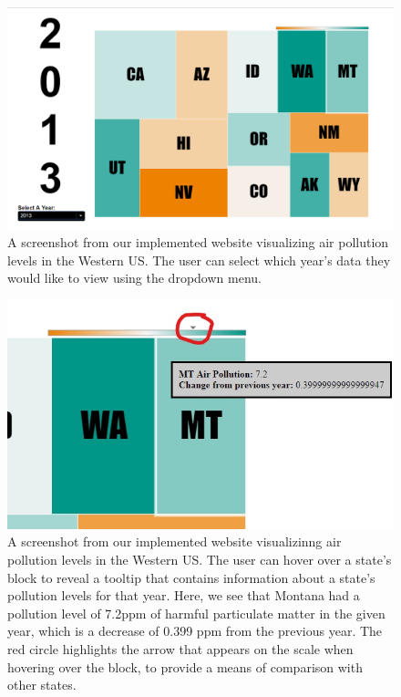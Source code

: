 \documentclass[journal]{vgtc}                %
\begin{document}
\begin{figure}
   \includegraphics[width=\columnwidth]{2013_viz.png}
   \caption{A screenshot from our implemented website visualizing air pollution levels in the Western US. The user can select which year's data they
   would like to view using the dropdown menu. \label{fig:screenshot_all}}
\end{figure}

\begin{figure}
   \includegraphics[width=\columnwidth]{screenshot_hover.jpg}
   \caption{A screenshot from our implemented website visualizinng air pollution levels in the Western US. The user can hover over a state's block
   to reveal a tooltip that contains information about a state's pollution levels for that year. Here, we see that Montana had a pollution level of
   7.2ppm of harmful particulate matter in the given year, which is a decrease of 0.399 ppm from the previous year. The red circle highlights the arrow
   that appears on the scale when hovering over the block, to provide a means of comparison with other states.\label{fig:screenshot_hover}}
\end{figure}
\end{document}
